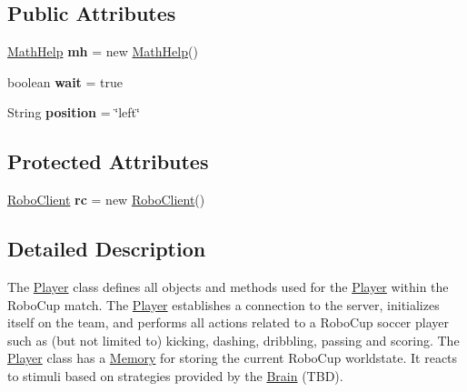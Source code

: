 \subsection*{Public Attributes}
\begin{DoxyCompactItemize}
\item 
\hypertarget{classPlayer_a7c430c6135e7adaab49cde397ceb31a4}{
\hyperlink{classMathHelp}{MathHelp} {\bfseries mh} = new \hyperlink{classMathHelp}{MathHelp}()}
\label{classPlayer_a7c430c6135e7adaab49cde397ceb31a4}

\item 
\hypertarget{classPlayer_a5febfb25d5578b52b97e02df2481c6ca}{
boolean {\bfseries wait} = true}
\label{classPlayer_a5febfb25d5578b52b97e02df2481c6ca}

\item 
\hypertarget{classPlayer_af5eb74245ac4311ade5eae02245112af}{
String {\bfseries position} = \char`\"{}left\char`\"{}}
\label{classPlayer_af5eb74245ac4311ade5eae02245112af}

\end{DoxyCompactItemize}
\subsection*{Protected Attributes}
\begin{DoxyCompactItemize}
\item 
\hypertarget{classPlayer_a56dbc9d8a3e1a70f6d9c83b8af3dd49e}{
\hyperlink{classRoboClient}{RoboClient} {\bfseries rc} = new \hyperlink{classRoboClient}{RoboClient}()}
\label{classPlayer_a56dbc9d8a3e1a70f6d9c83b8af3dd49e}

\end{DoxyCompactItemize}


\subsection{Detailed Description}
The \hyperlink{classPlayer}{Player} class defines all objects and methods used for the \hyperlink{classPlayer}{Player} within the RoboCup match. The \hyperlink{classPlayer}{Player} establishes a connection to the server, initializes itself on the team, and performs all actions related to a RoboCup soccer player such as (but not limited to) kicking, dashing, dribbling, passing and scoring. The \hyperlink{classPlayer}{Player} class has a \hyperlink{classMemory}{Memory} for storing the current RoboCup worldstate. It reacts to stimuli based on strategies provided by the \hyperlink{classBrain}{Brain} (TBD). 

